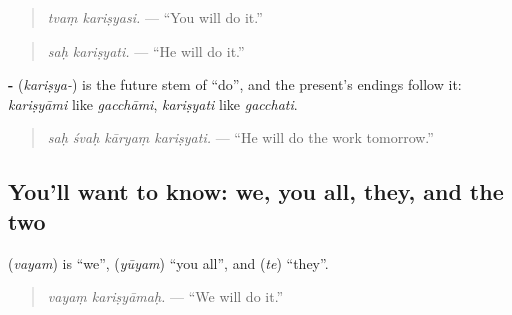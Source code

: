 \begin{quote}
\textbf{ }
\end{quote}

\begin{quote}
\emph{tvaṃ kariṣyasi.} — \textquotedblleft{}You will do it.\textquotedblright{}
\end{quote}

\begin{quote}
\textbf{ }
\end{quote}

\begin{quote}
\emph{saḥ kariṣyati.} — \textquotedblleft{}He will do it.\textquotedblright{}
\end{quote}

\textbf{-} (\emph{kariṣya-}) is the future stem of \textquotedblleft{}do\textquotedblright{}, and the present's endings follow it: \emph{kariṣyāmi} like \emph{gacchāmi}, \emph{kariṣyati} like \emph{gacchati}.

\begin{quote}
\textbf{   }
\end{quote}

\begin{quote}
\emph{saḥ śvaḥ kāryaṃ kariṣyati.} — \textquotedblleft{}He will do the work tomorrow.\textquotedblright{}
\end{quote}

\subsection*{You'll want to know: we, you all, they, and the two}
\textbf{} (\emph{vayam}) is \textquotedblleft{}we\textquotedblright{}, \textbf{} (\emph{yūyam}) \textquotedblleft{}you all\textquotedblright{}, and \textbf{} (\emph{te}) \textquotedblleft{}they\textquotedblright{}.

\begin{quote}
\textbf{ }
\end{quote}

\begin{quote}
\emph{vayaṃ kariṣyāmaḥ.} — \textquotedblleft{}We will do it.\textquotedblright{}
\end{quote}

\begin{quote}
\textbf{ }
\end{quote}

